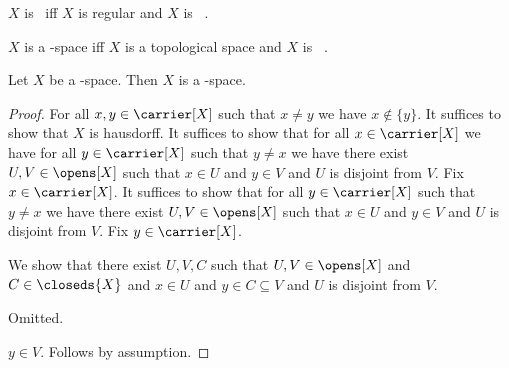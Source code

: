 \begin{definition}\label{teethree}
    $X$ is \teethree\ iff $X$ is regular and $X$ is \teezero\ .
\end{definition}

\begin{definition}\label{teethree_space}
    $X$ is a \teethree-space iff $X$ is a topological space and $X$ is \teethree\ .
\end{definition}

\begin{proposition}\label{teethree_space_is_teetwo_space}
    Let $X$ be a \teethree-space.
    Then $X$ is a \teetwo-space.
\end{proposition}
\begin{proof}
    For all $x,y \in \carrier[X]$ such that $x \neq y$ we have $x \notin \{y\}$.
    It suffices to show that $X$ is hausdorff.
    It suffices to show that for all $x \in \carrier[X]$ we have for all $y \in \carrier[X]$ such that $y \neq x$ we have there exist $U,V \in \opens[X]$ such that $x\in U$ and $y \in V$ and $U$ is disjoint from $V$.
    Fix $x \in \carrier[X]$.
    It suffices to show that for all $y \in \carrier[X]$ such that $y \neq x$ we have there exist $U,V \in \opens[X]$ such that $x\in U$ and $y \in V$ and $U$ is disjoint from $V$.
    Fix $y \in \carrier[X]$.

    We show that there exist $U,V,C$ such that $U,V \in \opens[X]$ and $C\in \closeds{X}$ and $x \in U$ and $y \in C \subseteq V$ and $U$ is disjoint from $V$.
    \begin{subproof}
        Omitted.
    \end{subproof}
    $y \in V$.
    Follows by assumption.
\end{proof}

